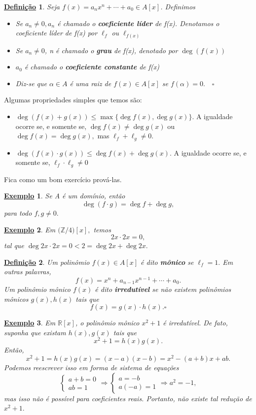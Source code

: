 \documentclass{article}
\newtheorem*{def*}{\underline{Defini\c c\~ao}}
\newtheorem{example}{\underline{Exemplo}}
\begin{document}
\begin{def*}
  Seja \(f(x) = a_{n}x^{n} + \cdots + a_{0}\in A[x]\). Definimos
  \begin{itemize}
   \item[1)] Se \(a_{n}\neq0, a_{n}\) é chamado o \textbf{coeficiente líder} de f(x). Denotamos o coeficiente líder
  de f(x) por \(\ell_{f}\) ou \(\ell_{f(x)}\)
  \item[2)] Se \(a_{n}\neq0\), n é chamado o \textbf{grau} de f(x), denotado por \(\deg(f(x))\)
  \item[3)] \(a_{0}\) é chamado o \textbf{coeficiente constante} de f(x)
  \item[4)] Diz-se que \(\alpha\in A\) é uma raiz de \(f(x)\in A[x]\) se \(f(\alpha ) = 0.\quad\square\)
  \end{itemize}
\end{def*}
  Algumas propriedades simples que temos são:
\begin{itemize}
  \item[i)] \(\deg{(f(x) + g(x))}\leq \max\{\deg{f(x)}, \deg{g(x)}\}\). A igualdade ocorre se, e somente se,
   \(\deg{f(x)}\neq \deg{g(x)}\) ou \(\deg{f(x)}=\deg{g(x)},\) mas \(\ell_{f} + \ell_{g}\neq0.\)
  \item[2)] \(\deg{(f(x)\cdot g(x))}\leq \deg{f(x)} + \deg{g(x)}.\) A igualdade ocorre se, e somente se,
 \(\ell_{f}\cdot \ell_{g} \neq0\)
\end{itemize}
  Fica como um bom exercício prová-las.
 \begin{example}
   Se A é um domínio, então 
  \[
    \deg{(f \cdot g)} = \deg{f} + \deg{g},
  \]
para todo \(f, g\neq0.\)
 \end{example}
 \begin{example}
  Em \(\biggl(\mathbb{Z}/4\biggr)[x],\) temos 
  \[
    2x \cdot 2x = 0,
  \]
tal que \(\deg{2x \cdot 2x} = 0 < 2 = \deg{2x} + \deg{2x}.\)
 \end{example}
\begin{def*}
  Um polinômio \(f(x)\in A[x]\) é dito \textbf{mônico} se \(\ell_{f} = 1.\) Em outras palavras, 
  \[
    f(x) = x^{n} + a_{n-1}x^{n-1} + \cdots + a_{0}.
  \]
Um polinômio mônico \(f(x)\) é dito \textbf{irredutível} se não existem polinômios mônicos
 \(g(x), h(x)\) tais que 
 \[
   f(x) = g(x)\cdot h(x).\square
 \]
\end{def*}
\begin{example}
  Em \(\mathbb{R}[x]\), o polinômio mônico \(x^{2} + 1\) é irredutível. De fato, suponha que existam 
 \(h(x), g(x)\) tais que 
  \[
    x^{2} + 1 = h(x)g(x).
  \]
  Então,
  \[
    x^{2} + 1 = h(x)g(x) = (x-a)(x-b) = x^{2} - (a+b)x +ab.
  \]
  Podemos reescrever isso em forma de sistema de equações 
  \[
   \left\{\begin{array}{ll}
      a + b = 0\\
      ab = 1
    \end{array}\right. 
    \Rightarrow  
    \left\{\begin{array}{ll}
        a = -b\\
        a(-a) = 1
    \end{array}\right.
    \Rightarrow 
    a^{2} = -1,
  \]
  mas isso não é possível para coeficientes reais. Portanto, não existe tal redução de \(x^{2} + 1.\)
\end{example}
\end{document}
